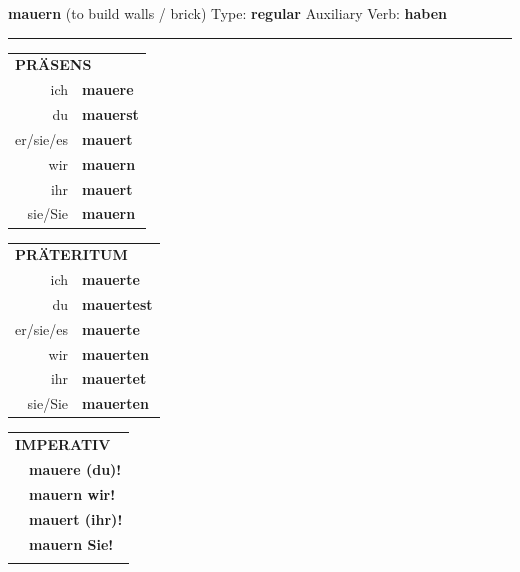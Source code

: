 \documentclass[10pt,a4paper]{revtex4-2}
\begin{document}
\begin{verbbox}
    {\Large \bf mauern} (to build walls / brick) \hfill Type: \textbf{regular} \hfill Auxiliary Verb: \textbf{haben} 
    
     \vspace{5pt}

    \hrule
    
    \vspace{5pt}

  \begin{tabular}{rl}
     \multicolumn{2}{l}{\textbf{PRÄSENS} }\\
    ich & \textbf{mauere}\\
    du & \textbf{mauerst}\\
    er/sie/es & \textbf{mauert}\\
    wir & \textbf{mauern}\\
    ihr & \textbf{mauert}\\
    sie/Sie & \textbf{mauern}\\
  \end{tabular}
  \hfill
  \begin{tabular}{rl}
    \multicolumn{2}{l}{\textbf{PRÄTERITUM} }\\
    ich & \textbf{mauerte}\\
    du & \textbf{mauertest}\\
    er/sie/es & \textbf{mauerte}\\
    wir & \textbf{mauerten}\\
    ihr & \textbf{mauertet}\\
    sie/Sie & \textbf{mauerten}\\
  \end{tabular}
  \hfill
  \begin{tabular}{rl}
     \multicolumn{2}{l}{\textbf{IMPERATIV} }\\
   & \textbf{mauere (du)!}\\
   & \textbf{mauern wir!}\\
   & \textbf{mauert (ihr)!}\\
   & \textbf{mauern Sie!}\\
   & \vspace{10pt}
  \end{tabular}

 \vspace{10pt}


\end{verbbox}
\end{document}
